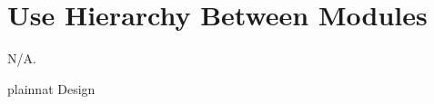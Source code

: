 \documentclass[12pt, titlepage]{article}
\begin{document}
\section{Use Hierarchy Between Modules} \label{SecUse}
N/A.
%
%


 {plainnat}
 {Design}
\end{document}
